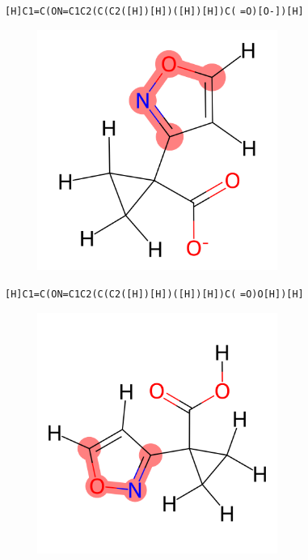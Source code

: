 \documentclass{beamer}
\begin{document}
\begin{frame}[fragile]
\verb|[H]C1=C(ON=C1C2(C(C2([H])[H])([H])[H])C(|
\verb|=O)[O-])[H]|

\begin{figure}
    \includegraphics[width=0.7\textwidth,height=0.7\textheight,keepaspectratio]{mol08.png}
\end{figure}
\end{frame}
\begin{frame}[fragile]
\verb|[H]C1=C(ON=C1C2(C(C2([H])[H])([H])[H])C(|
\verb|=O)O[H])[H]|

\begin{figure}
    \includegraphics[width=0.7\textwidth,height=0.7\textheight,keepaspectratio]{mol09.png}
\end{figure}
\end{frame}
\end{document}
